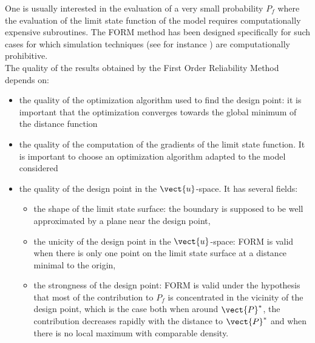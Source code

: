 {
  One is usually interested in the evaluation of a very small probability $P_f$ where the evaluation of the limit state function of the model requires computationally expensive subroutines. The FORM method has been designed specifically for such cases for which simulation techniques (see for instance ) are computationally prohibitive.\\

  The quality of the results obtained by the First Order Reliability Method depends on:
  \begin{itemize}
  \item the quality of the optimization algorithm used to find the design point: it is important that the optimization converges towards the global minimum of the distance function %
  \item the quality of the computation of the gradients of the limit state function. It is important to choose an optimization algorithm adapted to the model considered %
  \item the quality of the design point in the $\vect{u}$-space. It has several fields:
    \begin{itemize}
    \item the shape of the limit state surface: the boundary is supposed to be well approximated        by a plane near the design point,
    \item the unicity of the design point in the $\vect{u}$-space: FORM is valid when there is only one point on the limit state surface at a distance minimal to the origin,
    \item the strongness of the design point: FORM is valid under the hypothesis that most of the contribution to $P_f$ is concentrated in the vicinity of the design point, which is the case both when around $\vect{P}^*$, the contribution decreases rapidly with the distance to $\vect{P}^*$ and when there is no local maximum with comparable density.
    \end{itemize}


\end{itemize}}
